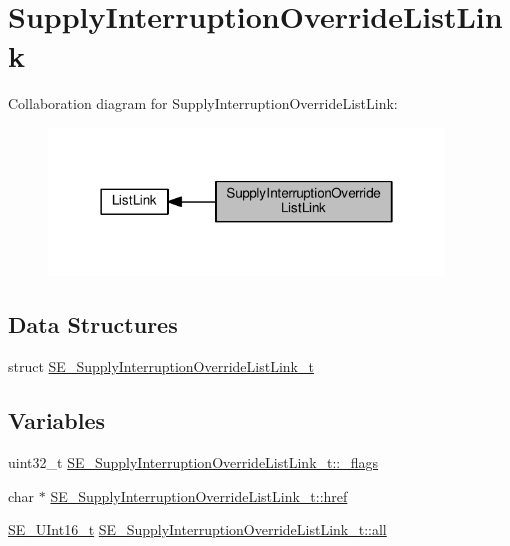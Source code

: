 \hypertarget{group__SupplyInterruptionOverrideListLink}{}\section{Supply\+Interruption\+Override\+List\+Link}
\label{group__SupplyInterruptionOverrideListLink}
Collaboration diagram for Supply\+Interruption\+Override\+List\+Link\+:\nopagebreak
\begin{figure}[H]
\begin{center}
\leavevmode
\includegraphics[width=298pt]{group__SupplyInterruptionOverrideListLink}
\end{center}
\end{figure}
\subsection*{Data Structures}
\begin{DoxyCompactItemize}
\item 
struct \hyperlink{structSE__SupplyInterruptionOverrideListLink__t}{S\+E\+\_\+\+Supply\+Interruption\+Override\+List\+Link\+\_\+t}
\end{DoxyCompactItemize}
\subsection*{Variables}
\begin{DoxyCompactItemize}
\item 
uint32\+\_\+t \hyperlink{group__SupplyInterruptionOverrideListLink_ga783e5fcd44df840ad1e21c12f1e80b97}{S\+E\+\_\+\+Supply\+Interruption\+Override\+List\+Link\+\_\+t\+::\+\_\+flags}
\item 
char $\ast$ \hyperlink{group__SupplyInterruptionOverrideListLink_gafbb7661ea1af8a68f693a16f93f56a30}{S\+E\+\_\+\+Supply\+Interruption\+Override\+List\+Link\+\_\+t\+::href}
\item 
\hyperlink{group__UInt16_gac68d541f189538bfd30cfaa712d20d29}{S\+E\+\_\+\+U\+Int16\+\_\+t} \hyperlink{group__SupplyInterruptionOverrideListLink_gae549a06d4bf58047ec9444e7b35a1062}{S\+E\+\_\+\+Supply\+Interruption\+Override\+List\+Link\+\_\+t\+::all}
\end{DoxyCompactItemize}


